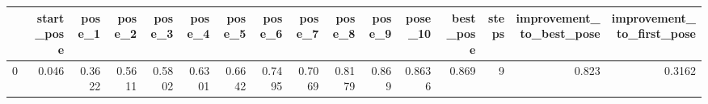 \begin{tabular}{lrrrrrrrrrrrrrrr}
\toprule
{} &  start\_pose &  pose\_1 &  pose\_2 &  pose\_3 &  pose\_4 &  pose\_5 &  pose\_6 &  pose\_7 &  pose\_8 &  pose\_9 &  pose\_10 &  best\_pose &  steps &  improvement\_to\_best\_pose &  improvement\_to\_first\_pose \\
\midrule
0 &       0.046 &  0.3622 &  0.5611 &  0.5802 &  0.6301 &  0.6642 &  0.7495 &  0.7069 &  0.8179 &   0.869 &   0.8636 &      0.869 &      9 &                     0.823 &                     0.3162 \\
\bottomrule
\end{tabular}
